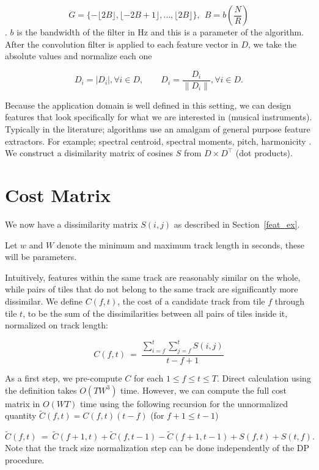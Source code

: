 \documentclass[twocolumn]{article}
\begin{document}
$$G=\{-\lfloor 2B\rfloor,\lfloor-2B+1\rfloor,\ldots, \lfloor 2 B \rfloor\}, \ \  B = b \left( \frac{N}{R} \right)$$. $b$ is the bandwidth of the filter in Hz and this is a parameter of the algorithm. After the convolution filter is applied to each feature vector in $D$, we take the absolute values and normalize each one 

\[
D_i = |D_i|, \forall i \in D, \hspace{2em}
D_i = \frac{D_i}{\|D_i\|}, \forall i \in D.
\]

Because the application domain is well defined in this setting, we can design features that look specifically for what we are interested in (musical instruments). Typically in the literature; algorithms use an amalgam of general purpose feature extractors. For example; spectral centroid, spectral moments, pitch, harmonicity \cite{tzanetakis1999framework}. We construct a disimilarity matrix of cosines $S$ from $D \times D^\top$ (dot products).

\section{Cost Matrix}\label{costmatrix_sec} %

We now have a dissimilarity matrix $S(i,j)$ as described in Section~\ref{feat_ex}. 

Let $w$ and $W$ denote the minimum and maximum track length in seconds, these will be parameters.

Intuitively, features within the same track are reasonably similar on the whole, while pairs of tiles that do not belong to the same track are significantly more dissimilar. We define $C(f,t)$, the cost of a candidate track from tile $f$ through tile $t$, to be the sum of the dissimilarities between all pairs of tiles inside it, normalized on track length:

\begin{dmath*}
C(f,t) ~=~ \frac{ \sum_{i=f}^{t} \sum_{j=f}^{t} S(i,j) }{ t-f+1 }
\end{dmath*}

As a first step, we pre-compute $C$ for each $1 \le f \le t \le T$. Direct calculation using the definition takes $O(T W^3)$ time. However, we can compute the full cost matrix in $O(W T)$ time using the following recursion for the unnormalized quantity $\tilde
C(f,t) = C(f,t)(t-f)$ (for $f+1 \le t-1$)


\begin{dmath*}
\tilde C(f,t) ~=~ \tilde C(f+1,t) + \tilde C(f,t-1) - \tilde C(f+1,t-1) + S(f,t) + S(t,f)
.
\end{dmath*}
 Note that the track size normalization step can be done independently of the DP procedure. 
\end{document}
